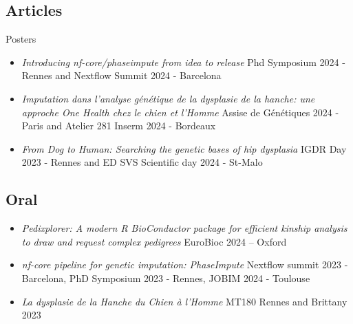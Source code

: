 \documentclass[11pt,a4paper]{moderncv}
\begin{document}
\subsection{Articles}
\begingroup
\nocite{*}
\renewcommand{\section}[2]{}%
\printbibliography
\endgroup

\section{Past Presentations}
    \subsection{Posters}
        \begin{itemize}
            \item \textit{Introducing nf-core/phaseimpute from idea to release} \newline
            Phd Symposium 2024 - Rennes and Nextflow Summit 2024 - Barcelona \\
            \item \textit{Imputation dans l'analyse génétique de la dysplasie de la hanche: une approche One Health chez le chien et l’Homme} \newline
            Assise de Génétiques 2024 - Paris and Atelier 281 Inserm 2024 - Bordeaux \\
            \item \textit{From Dog to Human: Searching the genetic bases of hip dysplasia} \newline
            IGDR Day 2023 - Rennes and ED SVS Scientific day 2024 - St-Malo \\
        \end{itemize}

    \subsection{Oral}
        \begin{itemize}
            \item \textit{Pedixplorer: A modern R BioConductor package for efficient kinship analysis to draw and request complex pedigrees} \newline
            EuroBioc 2024 – Oxford \\
            \item \textit{nf-core pipeline for genetic imputation: PhaseImpute} \newline
            Nextflow summit 2023 - Barcelona, PhD Symposium 2023 - Rennes, JOBIM 2024 - Toulouse \\
            \item \textit{La dysplasie de la Hanche du Chien à l’Homme} \newline
            MT180 Rennes and Brittany 2023 \\
        \end{itemize}
\end{document}
